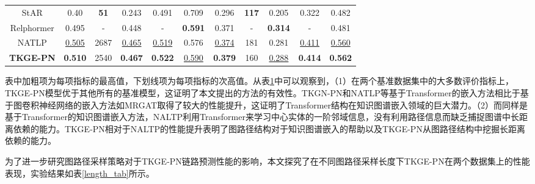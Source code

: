 \begin{table}[htbp]
\begin{center}
\begin{tabular}{*{11}{c}}
            StAR&0.40&\textbf{51}&0.243	&0.491	&0.709	&0.296	&\textbf{117}&	0.205	&0.322	&0.482\\
            Relphormer&0.495&-&0.448&	-	&\textbf{0.591}&	0.371		&-&\textbf{0.314}	&-	&0.481\\
            \cmidrule{1-11}
            NATLP&\underline{0.505}&2687&\underline{0.465}&\underline{0.519}&0.576&\underline{0.374}&181&0.281&\underline{0.411}&\underline{0.560}\\
            \textbf{TKGE-PN}&\textbf{0.510}&2540&\textbf{0.467}	&\textbf{0.522}	&\underline{0.590}	&\textbf{0.379}	&160	&\underline{0.288}	&\textbf{0.414}	&\textbf{0.562}\\
            \bottomrule
        \end{tabular}
        \label{TKGE-PN_result_tab}
    \end{center}
  \end{table}

  表中加粗项为每项指标的最高值，下划线项为每项指标的次高值。从表\ref{TKGE-PN_result_tab}中可以观察到，（1）在两个基准数据集中的大多数评价指标上，TKGE-PN模型优于其他所有的基准模型，这证明了本文提出的方法的有效性。TKGN-PN和NATLP等基于Transformer的嵌入方法相比于基于图卷积神经网络的嵌入方法如MRGAT取得了较大的性能提升，这证明了Transformer结构在知识图谱嵌入领域的巨大潜力。（2）而同样是基于Transformer的知识图谱嵌入方法，NALTP利用Transformer来学习中心实体的一阶邻域信息，没有利用路径信息而缺乏捕捉图谱中长距离依赖的能力。TKGE-PN相对于NALTP的性能提升表明了图路径结构对于知识图谱嵌入的帮助以及TKGE-PN从图路径结构中挖掘长距离依赖的能力。

  为了进一步研究图路径采样策略对于TKGE-PN链路预测性能的影响，本文探究了在不同图路径采样长度下TKGE-PN在两个数据集上的性能表现，实验结果如表\ref{length_tab}所示。

